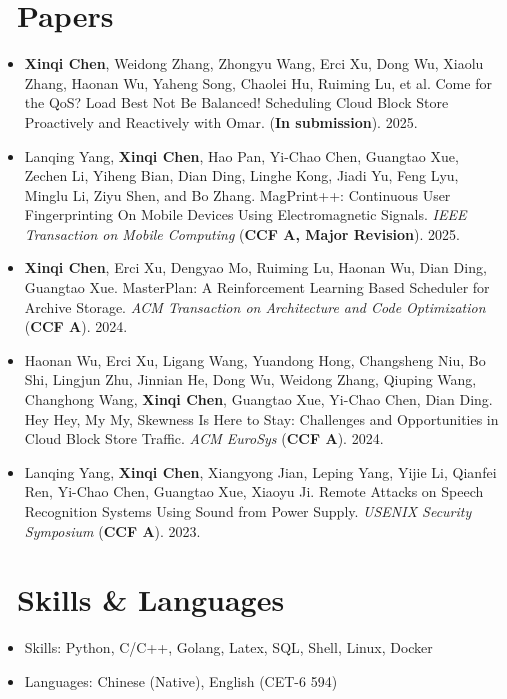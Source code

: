 \documentclass{resume}
\begin{document}
\section{\faFileTextO \ Papers}
\begin{itemize}[parsep=0.5ex]
  \item \textbf{Xinqi Chen}, Weidong Zhang, Zhongyu Wang, Erci Xu, Dong Wu, Xiaolu Zhang, Haonan Wu, Yaheng Song, Chaolei Hu, Ruiming Lu, et al. Come for the QoS? Load Best Not Be Balanced! Scheduling Cloud Block Store Proactively and Reactively with
  Omar. (\textbf{In submission}). 2025.
  \item Lanqing Yang, \textbf{Xinqi Chen}, Hao Pan, Yi-Chao Chen, Guangtao Xue, Zechen Li, Yiheng Bian,
  Dian Ding, Linghe Kong, Jiadi Yu, Feng Lyu, Minglu Li, Ziyu Shen, and Bo Zhang. MagPrint++: Continuous User Fingerprinting On
  Mobile Devices Using Electromagnetic Signals. \textit{IEEE Transaction on Mobile Computing} (\textbf{CCF A, Major Revision}). 2025.
  \item \textbf{Xinqi Chen}, Erci Xu, Dengyao Mo, Ruiming Lu, Haonan Wu, Dian Ding, Guangtao Xue. MasterPlan: A Reinforcement Learning Based Scheduler for Archive Storage. \textit{ACM Transaction on Architecture and Code Optimization} (\textbf{CCF A}). 2024.
  \item Haonan Wu, Erci Xu, Ligang Wang, Yuandong Hong, Changsheng Niu, Bo Shi, Lingjun Zhu, Jinnian He, Dong Wu, Weidong Zhang, Qiuping Wang, Changhong Wang, \textbf{Xinqi Chen}, Guangtao Xue, Yi-Chao Chen, Dian Ding. Hey Hey, My My, Skewness Is Here to Stay: Challenges and Opportunities in Cloud Block Store Traffic. \textit{ACM EuroSys} (\textbf{CCF A}). 2024.
  \item Lanqing Yang, \textbf{Xinqi Chen}, Xiangyong Jian, Leping Yang, Yijie Li, Qianfei Ren, Yi-Chao Chen, Guangtao Xue, Xiaoyu Ji. Remote Attacks on Speech Recognition Systems Using Sound from Power Supply. \textit{USENIX Security Symposium} (\textbf{CCF A}). 2023.
\end{itemize}

\section{\faCogs\ Skills \& Languages}
\begin{itemize}[parsep=0.5ex]
  \item Skills: Python, C/C++, Golang, Latex, SQL, Shell, Linux, Docker
  \item Languages: Chinese (Native), English (CET-6 594)
\end{itemize}
\end{document}
